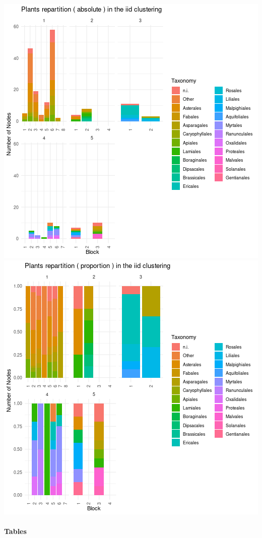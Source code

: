 \includegraphics{figure/iid_plot_taxonomy_plants-1.png}\includegraphics{figure/iid_plot_taxonomy_plants-2.png}

\hypertarget{tables}{%
\paragraph{Tables}\label{tables}}

